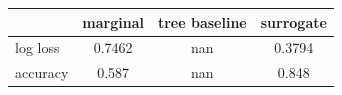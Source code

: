 \begin{tabular}{lccc}
\toprule
 & marginal & tree baseline & surrogate \\
\midrule
log loss & 0.7462 & nan & 0.3794 \\
accuracy & 0.587 & nan & 0.848 \\
\bottomrule
\end{tabular}
